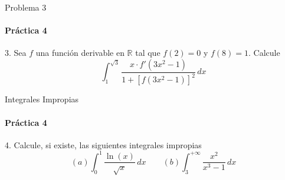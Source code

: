 \documentclass{plantillaPPT}
\begin{document}
\begin{frame}{Problema 3}
\framesubtitle{Práctica 4}
3. Sea \(f\) una función derivable en \(\mathbb{R}\) tal que \(f(2)=0\) y \(f(8)=1\). Calcule
\[
\int_1^{\sqrt{3}} \frac{x \cdot f'(3x^2-1)}{1+\left[f(3x^2-1)\right]^2}\,dx
\]
\end{frame}
\begin{frame}{Integrales Impropias}
\framesubtitle{Práctica 4}
4. Calcule, si existe, las siguientes integrales impropias
\[(a)\int_0^1 \frac{\ln(x)}{\sqrt{x}}\,dx \qquad (b)\int_3^{+\infty} \frac{x^2}{x^3-1}\,dx\]
    
\end{frame}
\end{document}
